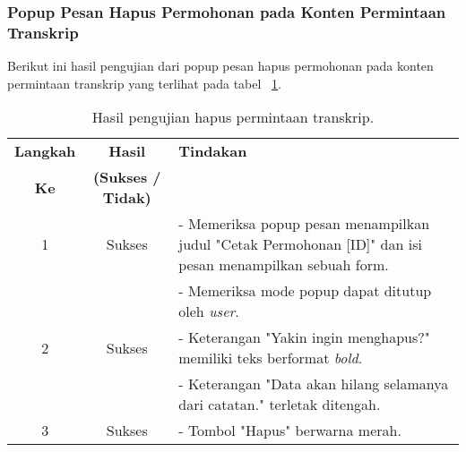 \subsubsection{Popup Pesan Hapus Permohonan pada Konten Permintaan Transkrip}
Berikut ini hasil pengujian dari popup pesan hapus permohonan pada konten permintaan transkrip yang terlihat pada tabel ~\ref{hasil:HapusPermintaanTranskrip}.
\begin{table}[H]
	\centering 
	\caption{Hasil pengujian hapus permintaan transkrip.}
	\label{hasil:HapusPermintaanTranskrip}
	\begin{tabular}{|c| c| p{}|}
		\toprule
		\textbf{Langkah} & \textbf{Hasil} & \textbf{Tindakan}\\
		\textbf{Ke} & \textbf{(Sukses / Tidak)} &\\
		\midrule
		1&Sukses& - Memeriksa popup pesan menampilkan judul "Cetak Permohonan [ID]" dan isi pesan menampilkan sebuah form.\\
		&& - Memeriksa mode popup dapat ditutup oleh \textit{user}.\\
		\hline
		2&Sukses& - Keterangan "Yakin ingin menghapus?" memiliki teks berformat \textit{bold}. \\
		&& - Keterangan "Data akan hilang selamanya dari catatan." terletak ditengah.\\
		\hline
		3&Sukses&- Tombol "Hapus" berwarna merah.\\	
		\bottomrule		
	\end{tabular} 
\end{table}

